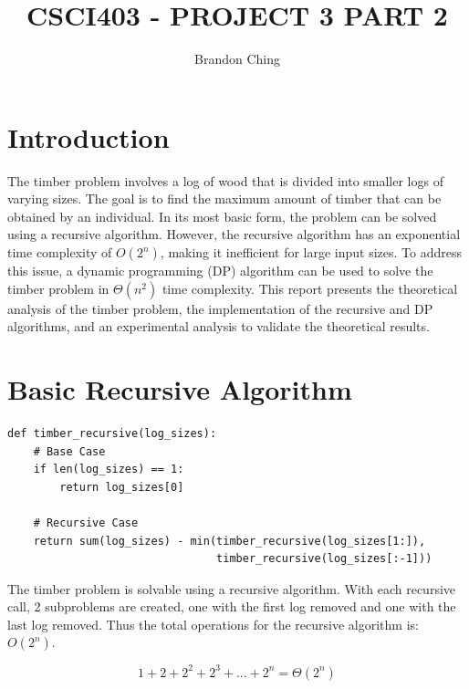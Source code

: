 \documentclass[12pt]{article}
\title{\uppercase{CSCI403 - Project 3 Part 2}}
\author{Brandon Ching}
\begin{document}
\section{Introduction}
The timber problem involves a log of wood that is divided into smaller logs of varying sizes. The goal is to find the maximum amount of timber that can be obtained by an individual. In its most basic form, the problem can be solved using a recursive algorithm. However, the recursive algorithm has an exponential time complexity of $O(2^n)$, making it inefficient for large input sizes. To address this issue, a dynamic programming (DP) algorithm can be used to solve the timber problem in $\Theta(n^2)$ time complexity. This report presents the theoretical analysis of the timber problem, the implementation of the recursive and DP algorithms, and an experimental analysis to validate the theoretical results.

\section{Basic Recursive Algorithm}
\label{timber_recursive}
\begin{verbatim}
def timber_recursive(log_sizes):
    # Base Case
    if len(log_sizes) == 1:
        return log_sizes[0]

    # Recursive Case
    return sum(log_sizes) - min(timber_recursive(log_sizes[1:]),
                                timber_recursive(log_sizes[:-1]))
\end{verbatim}


The timber problem is solvable using a recursive algorithm. With each recursive call, 2 subproblems are created, one with the first log removed and one with the last log removed. Thus the total operations for the recursive algorithm is: $O(2^n)$.

\begin{equation}
    1 + 2 + 2^2 + 2^3 + ... + 2^n = \Theta(2^n)
\end{equation}

\pagebreak
\end{document}
